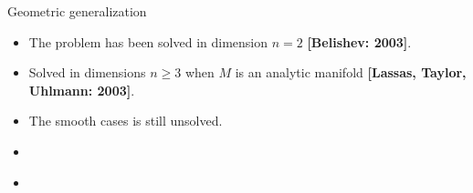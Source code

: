 \documentclass[aspectratio=169]{beamer}
\newcommand\boldgold[1]{\textcolor{csu_gold}{\textbf{#1}}}
\begin{document}
\begin{frame}{Geometric generalization}
\vfill
\begin{itemize}
\pause
    \item The problem has been solved in dimension $n=2$ \boldgold{[Belishev: 2003]}.
\pause
    \item Solved in dimensions $n\geq 3$ when $M$ is an analytic manifold \boldgold{[Lassas, Taylor, Uhlmann: 2003]}.
\pause
\item The smooth cases is still unsolved.
\end{itemize}
\vfill
\end{frame}

\begin{frame}{}
\vfill
\begin{itemize}
\item
\end{itemize}
\vfill
\end{frame}

\begin{frame}{}
\vfill
\begin{itemize}
\item
\end{itemize}
\vfill
\end{frame}
\end{document}
